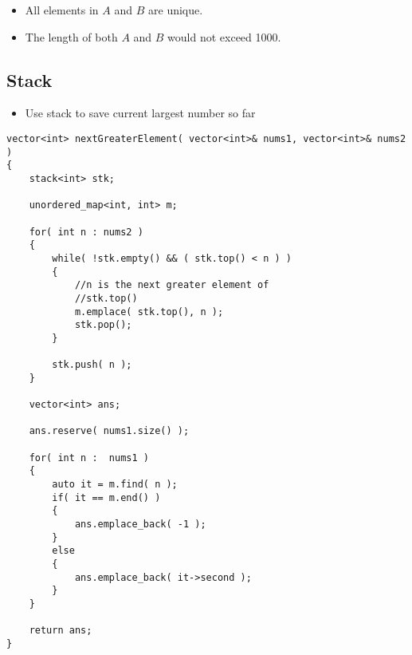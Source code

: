 \begin{itemize}
\item All elements in $A$ and $B$ are unique.
\item The length of both $A$ and $B$ would not exceed 1000.
\end{itemize}

\subsection{Stack}
\begin{itemize}
\item Use stack to save current largest number so far
\end{itemize}

\setcounter{lstlisting}{0}
\begin{lstlisting}[style=customc, caption={Stack}]
vector<int> nextGreaterElement( vector<int>& nums1, vector<int>& nums2 )
{
    stack<int> stk;

    unordered_map<int, int> m;

    for( int n : nums2 )
    {
        while( !stk.empty() && ( stk.top() < n ) )
        {
            //n is the next greater element of
            //stk.top()
            m.emplace( stk.top(), n );
            stk.pop();
        }

        stk.push( n );
    }

    vector<int> ans;

    ans.reserve( nums1.size() );

    for( int n :  nums1 )
    {
        auto it = m.find( n );
        if( it == m.end() )
        {
            ans.emplace_back( -1 );
        }
        else
        {
            ans.emplace_back( it->second );
        }
    }

    return ans;
}

\end{lstlisting}